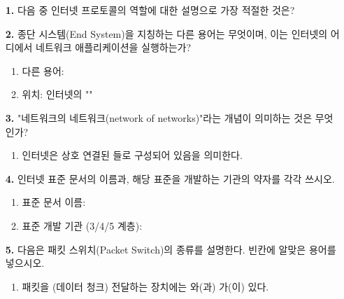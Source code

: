 \documentclass[a4paper, 10pt]{article}
\newcommand{\ansline}[1]{\underline{\hspace{#1}}}
\newcommand{\sectionbox}[1]{
  \vspace{0.5em}
  \noindent\fbox{\textbf{#1}}
  \vspace{0.5em}
}
\begin{document}
\begin{enumerate}[itemsep=2em, leftmargin=2em, label={}]

\item[] \sectionbox{I. 용어 및 기본 개념 (5문제)}

\item[\textbf{1.}] 다음 중 인터넷 프로토콜의 역할에 대한 설명으로 가장 적절한 것은?

\item[\textbf{2.}] 종단 시스템(End System)을 지칭하는 다른 용어는 무엇이며, 이는 인터넷의 어디에서 네트워크 애플리케이션을 실행하는가?
\begin{enumerate}[label=\alph*., itemsep=0.3em, leftmargin=1.5em]
    \item 다른 용어: \ansline{3cm}
    \item 위치: 인터넷의 "\ansline{3cm}"
\end{enumerate}

\item[\textbf{3.}] "네트워크의 네트워크(network of networks)"라는 개념이 의미하는 것은 무엇인가?
\begin{enumerate}[label=\alph*., itemsep=0.3em, leftmargin=1.5em]
    \item 인터넷은 상호 연결된 \ansline{4cm}들로 구성되어 있음을 의미한다.
\end{enumerate}

\item[\textbf{4.}] 인터넷 표준 문서의 이름과, 해당 표준을 개발하는 기관의 약자를 각각 쓰시오.
\begin{enumerate}[label=\alph*., itemsep=0.3em, leftmargin=1.5em]
    \item 표준 문서 이름: \ansline{4cm}
    \item 표준 개발 기관 (3/4/5 계층): \ansline{4cm}
\end{enumerate}

\item[\textbf{5.}] 다음은 패킷 스위치(Packet Switch)의 종류를 설명한다. 빈칸에 알맞은 용어를 넣으시오.
\begin{enumerate}[label={}, itemsep=0.3em, leftmargin=1.5em]
    \item 패킷을 (데이터 청크) 전달하는 장치에는 \ansline{3cm}와(과) \ansline{3cm}가(이) 있다.
\end{enumerate}



\end{enumerate}
\end{document}
